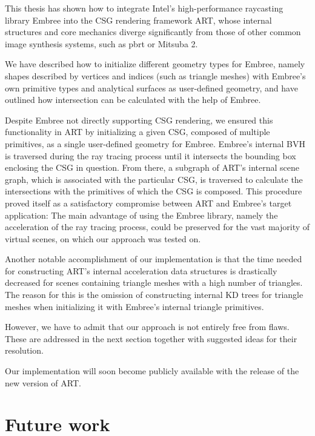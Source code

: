 \label{chap:conclusion}

This thesis has shown how to integrate Intel's high-performance raycasting library Embree into the CSG rendering framework ART, whose internal structures and core mechanics diverge significantly from those of other common image synthesis systems, such as pbrt or Mitsuba 2.

We have described how to initialize different geometry types for Embree, namely shapes described by vertices and indices (such as triangle meshes) with Embree's own primitive types and analytical surfaces as user-defined geometry, and have outlined how intersection can be calculated with the help of Embree. 

Despite Embree not directly supporting CSG rendering, we ensured this functionality in ART by initializing a given CSG, composed of multiple primitives, as a single user-defined geometry for Embree. Embree's internal BVH is traversed during the ray tracing process until it intersects the bounding box enclosing the CSG in question. From there, a subgraph of ART's internal scene graph, which is associated with the particular CSG, is traversed to calculate the intersections with the primitives of which the CSG is composed. This procedure proved itself as a satisfactory compromise between ART and Embree's target application: The main advantage of using the Embree library, namely the acceleration of the ray tracing process, could be preserved for the vast majority of virtual scenes, on which our approach was tested on.

Another notable accomplishment of our implementation is that the time needed for constructing ART's internal acceleration data structures is drastically decreased for scenes containing triangle meshes with a high number of triangles. The reason for this is the omission of constructing internal KD trees for triangle meshes when initializing it with Embree's internal triangle primitives.

However, we have to admit that our approach is not entirely free from flaws. These are addressed in the next section together with suggested ideas for their resolution.  

Our implementation will soon become publicly available with the release of the new version of ART.

\section*{Future work}

